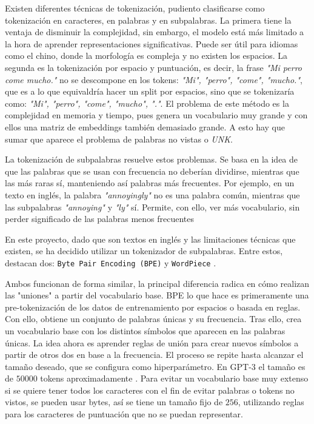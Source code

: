 \documentclass[11pt]{book}
\begin{document}
Existen diferentes técnicas de tokenización, pudiento clasificarse como tokenización en caracteres, en palabras y en subpalabras. La primera tiene la ventaja de disminuir la complejidad, sin embargo, el modelo está más limitado a la hora de aprender representaciones significativas. Puede ser útil para idiomas como el chino, donde la morfología es compleja y no existen los espacios. La segunda es la tokenización por espacio y puntuación, es decir, la frase \textit{"Mi perro come mucho."} no se descompone en los tokens: \textit{"Mi", "perro", "come", "mucho."}, que es a lo que equivaldría hacer un split por espacios, sino que se tokenizaría como: \textit{"Mi", "perro", "come", "mucho", "."}. El problema de este método es la complejidad en memoria y tiempo, pues genera un vocabulario muy grande y con ellos una matriz de embeddings también demasiado grande. A esto hay que sumar que aparece el problema de palabras no vistas o \textit{UNK}. 

La tokenización de subpalabras resuelve estos problemas. Se basa en la idea de que las palabras que se usan con frecuencia no deberían dividirse, mientras que las más raras sí, manteniendo así palabras más frecuentes. Por ejemplo, en un texto en inglés, la palabra \textit{"annoyingly"} no es una palabra común, mientras que las subpalabras \textit{"annoying"} y \textit{"ly"} sí. Permite, con ello, ver más vocabulario, sin perder significado de las palabras menos frecuentes \parencite{lmpo2020bpe}

En este proyecto, dado que son textos en inglés y las limitaciones técnicas que existen, se ha decidido utilizar un tokenizador de subpalabras. Entre estos, destacan dos: \texttt{Byte Pair Encoding (BPE)} y \texttt{WordPiece} \parencite{huggingface_tokenizer_summary}. 

Ambos funcionan de forma similar, la principal diferencia radica en cómo realizan las "uniones" a partir del vocabulario base. BPE lo que hace es primeramente una pre-tokenización de los datos de entrenamiento por espacios o basada en reglas. Con ello, obtiene un conjunto de palabras únicas y su frecuencia. Tras ello, crea un vocabulario base con los distintos símbolos que aparecen en las palabras únicas. La idea ahora es aprender reglas de unión para crear nuevos símbolos a partir de otros dos en base a la frecuencia. El proceso se repite hasta alcanzar el tamaño deseado, que se configura como hiperparámetro. En GPT-3 el tamaño es de $50000$ tokens aproximadamente \parencite{paul2025vocabsize}. Para evitar un vocabulario base muy extenso si se quiere tener todos los caracteres con el fin de evitar palabras o tokens no vistos, se pueden usar bytes, así se tiene un tamaño fijo de $256$, utilizando reglas para los caracteres de puntuación que no se puedan representar.
\end{document}
